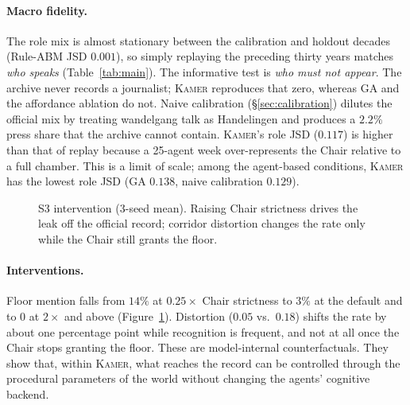 \documentclass[sigconf,review,anonymous]{acmart}
\newcommand{\sys}{\textsc{Kamer}}
\begin{document}
\paragraph{Macro fidelity.} The role mix is almost stationary between the
calibration and holdout decades (Rule-ABM JSD $0.001$), so simply
replaying the preceding thirty years matches \emph{who speaks}
(Table~\ref{tab:main}). The informative test is \emph{who must not
appear}. The archive never records a journalist; \sys{} reproduces that
zero, whereas GA and the affordance ablation do not. Naive calibration
(\S\ref{sec:calibration}) dilutes the official mix by treating wandelgang
talk as Handelingen and produces a $2.2\%$ press share that the archive
cannot contain. \sys{}'s role JSD ($0.117$) is higher than that of replay
because a 25-agent week over-represents the Chair relative to a full
chamber. This is a limit of scale; among the agent-based conditions,
\sys{} has the lowest role JSD (GA $0.138$, naive calibration $0.129$).

\begin{figure}[t]
\centering
{}
\caption{S3 intervention (3-seed mean). Raising Chair strictness drives
the leak off the official record; corridor distortion changes the rate
only while the Chair still grants the floor.}
\label{fig:cf}
\end{figure}

\paragraph{Interventions.} Floor mention falls from $14\%$ at
$0.25\times$ Chair strictness to $3\%$ at the default and to $0$ at
$2\times$ and above (Figure~\ref{fig:cf}). Distortion ($0.05$ vs.\
$0.18$) shifts the rate by about one percentage point while recognition is
frequent, and not at all once the Chair stops granting the floor. These
are model-internal counterfactuals. They show that, within \sys{}, what
reaches the record can be controlled through the procedural parameters of
the world without changing the agents' cognitive backend.
\end{document}
